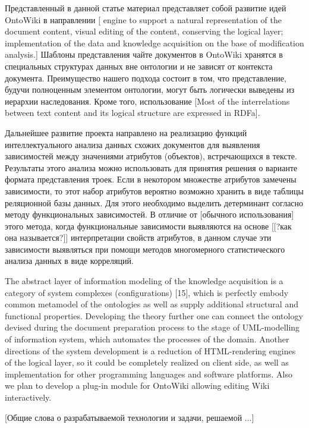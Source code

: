 \documentclass[utf8]{../IncArticle}
\newcommand{\e}[2][fcolor]{\textcolor{pcolor}{[}\textcolor{#1}{#2}\textcolor{pcolor}{]}}
\begin{document}
Представленный в данной статье материал представляет собой развитие
идей OntoWiki в направлении \e{
engine to support a natural representation of the document content,
visual editing of the content, conserving the logical layer;
implementation of the data and knowledge acquisition on the base of
modification analysis.}  Шаблоны представления чайте документов в
OntoWiki хранятся в специальных структурах данных вне онтологии и не
зависят от контекста документа.  Преимущество нашего подхода состоит в
том, что представление, будучи полноценным элементом онтологии, могут
быть логически выведены из иерархии наследования.  Кроме того,
использование \e{Most of the
interrelations between text content and its logical structure are
expressed in RDFa}.


Дальнейшее развитие проекта направлено на реализацию функций
интеллектуального анализа данных схожих документов для выявления
зависимостей между значениями атрибутов (объектов), встречающихся в
тексте.  Результаты этого анализа можно использовать для принятия
решения о варианте формата представления троек.  Если в некотором
множестве атрибутов замечены зависимости, то этот набор атрибутов
вероятно возможно хранить в виде таблицы реляционной базы данных.  Для
этого необходимо выделить детерминант согласно методу функциональных
зависимостей.  В отличие от \e{обычного использования} этого метода,
когда функциональные зависимости выявляются на основе \e{[?как она
  называется?]} интерпретации свойств атрибутов, в данном случае эти
зависимости выявляться при помощи методов многомерного статистического
анализа данных в виде корреляций.

The abstract layer of information modeling of the knowledge acquisition is a category of system complexes (configurations) [15], which is perfectly embody common metamodel of the ontologies as well as supply additional structural and functional properties. Developing the theory further one can connect the ontology devised during the document preparation process to the stage of UML-modelling of information system, which automates the processes of the domain.
Another directions of the system development is a reduction of HTML-rendering engines of the logical layer, so it could be completely realized on client side, as well as implementation for other programming languages and software platforms. Also we plan to develop a plug-in module for OntoWiki allowing editing Wiki interactively.

\conclusion

\e{Общие слова о разрабатываемой технологии и задачи, решаемой ...}
\end{document}
